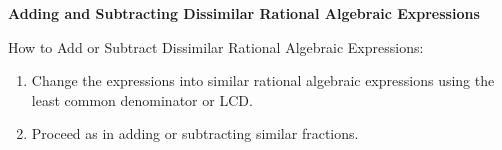 \begin{center}
\textbf{Adding and Subtracting Dissimilar Rational Algebraic Expressions}
\end{center}

\vspace*{1ex}


How to Add or Subtract Dissimilar Rational Algebraic Expressions:
\begin{enumerate}[label = \arabic*. ]
\item Change the expressions into similar rational algebraic expressions using the least common denominator  or  LCD.  
\item Proceed as in adding or subtracting similar fractions.  
\end{enumerate}


